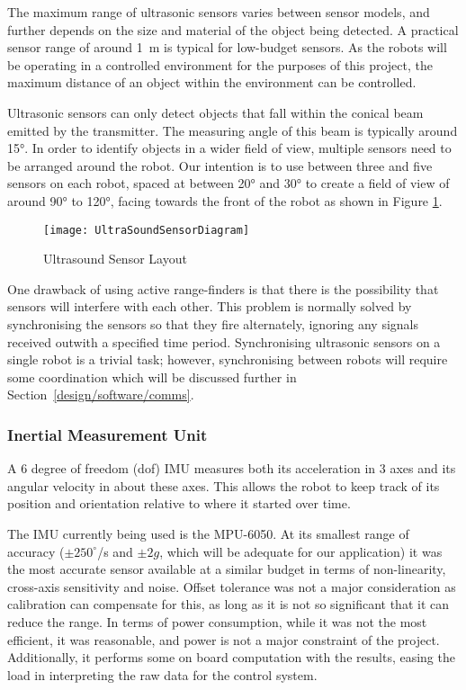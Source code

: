 The maximum range of ultrasonic sensors varies between sensor models, and further
depends on the size and material of the object being detected. A practical sensor
range of around \SI{1}{\m} is typical for low-budget sensors. As the robots will be
operating in a controlled environment for the purposes of this project, the maximum
distance of an object within the environment can be controlled.

Ultrasonic sensors can only detect objects that fall within the conical beam emitted
by the transmitter. The measuring angle of this beam is typically around \ang{15}.
In order to identify objects in a wider field of view, multiple sensors need to be
arranged around the robot. Our intention is to use between three and five sensors
on each robot, spaced at between \ang{20} and \ang{30} to create a field of view
of around \ang{90} to \ang{120}, facing towards the front of the robot as shown in Figure \ref{UltraSoundSensorDiagram}.

\begin{figure}[!ht]
	\centering
	\texttt{[image: UltraSoundSensorDiagram]}
	\caption{Ultrasound Sensor Layout}\label{UltraSoundSensorDiagram}

\end{figure}

One drawback of using active range-finders is that there is the possibility that
sensors will interfere with each other. This problem is normally solved by
synchronising the sensors so that they fire alternately, ignoring any signals
received outwith a specified time period. Synchronising ultrasonic sensors on a
single robot is a trivial task; however, synchronising between robots will require
some coordination which will be discussed further in Section~\ref{design/software/comms}.


\subsubsection{Inertial Measurement Unit}
A 6 degree of freedom (dof) IMU measures both its acceleration in 3 axes and its angular velocity in about these axes. This allows the robot to keep track of its position and orientation relative to where it started over time.

The IMU currently being used is the MPU-6050. At its smallest range of accuracy ($\pm250^\circ$/s and $\pm2g$\cite{MPU6050Datasheet}, which will be adequate for our application) it was the most accurate sensor available at a similar budget in terms of non-linearity, cross-axis sensitivity and noise. Offset tolerance was not a major consideration as calibration can compensate for this, as long as it is not so significant that it can reduce the range. In terms of power consumption, while it was not the most efficient, it was reasonable, and power is not a major constraint of the project. Additionally, it performs some on board computation with the results, easing the load in interpreting the raw data for the control system.

